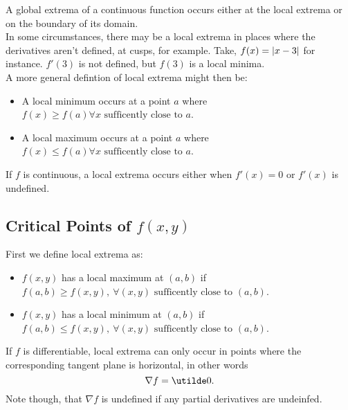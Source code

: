 \documentclass{report}
\begin{document}
A global extrema of a continuous function occurs either at the local extrema or on the boundary of its domain. \\

In some circumstances, there may be a local extrema in places where the derivatives aren't defined, at cusps, for example. Take, $f(x)=\left| x-3 \right|$ for instance. $f'(3)$ is not defined, but $f(3)$ is a local minima. \\

A more general defintion of local extrema might then be:
\begin{itemize}
	\item A local minimum occurs at a point $a$ where $f(x)\geq f(a) \forall x \text{ sufficently close to } a$.
	\item A local maximum occurs at a point $a$ where $f(x)\leq f(a) \forall x \text{ sufficently close to } a$.
\end{itemize}
If $f$ is continuous, a local extrema occurs either when $f'(x)=0$ or $f'(x)$ is undefined.

\subsection*{Critical Points of $f(x,y)$}
First we define local extrema as:
\begin{itemize}
	\item $f(x,y)$ has a local maximum at $(a,b)$ if $f(a,b)\geq f(x,y),\ \forall (x,y) \text{ sufficently close to } (a,b)$.
	\item $f(x,y)$ has a local minimum at $(a,b)$ if $f(a,b)\leq f(x,y),\ \forall (x,y) \text{ sufficently close to } (a,b)$.
\end{itemize}
If $f$ is differentiable, local extrema can only occur in points where the corresponding tangent plane is horizontal, in other words 
$$
	\nabla f = \ut{0}.
$$
Note though, that $\nabla f$ is undefined if any partial derivatives are undeinfed.


\end{document}
